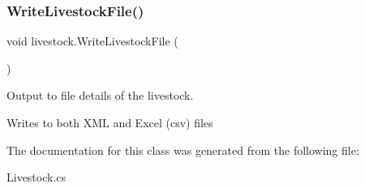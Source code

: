 \subsubsection{\texorpdfstring{WriteLivestockFile()}{WriteLivestockFile()}}
{\footnotesize\ttfamily void livestock.\+Write\+Livestock\+File (\begin{DoxyParamCaption}{ }\end{DoxyParamCaption})\hspace{0.3cm}{\ttfamily [inline]}}



Output to file details of the livestock. 

Writes to both X\+ML and Excel (csv) files 

The documentation for this class was generated from the following file\+:\begin{DoxyCompactItemize}
\item 
Livestock.\+cs\end{DoxyCompactItemize}
